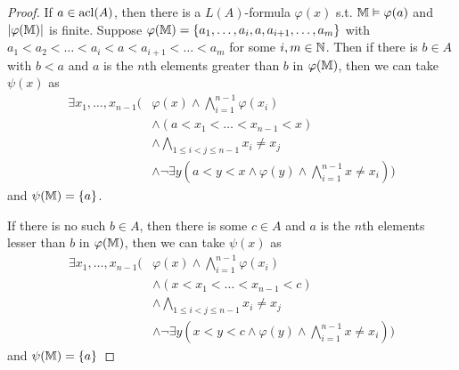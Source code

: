 \documentclass[11pt]{article}
\begin{document}
\begin{proof}
If \(a\in\operatorname{acl}(A)\), then there is a \(L(A)\)-formula \(\varphi(x)\) s.t. \(\mathbb{M}\vDash\varphi(a)\) and \(\abs{\varphi(\M)}\) is
finite. Suppose \(\varphi(\mathbb{M})=\{a_1,\dots,a_i,a,a_{i+1},\dots,a_m\}\) with \(a_1<a_2<\dots<a_i<a<a_{i+1}<\dots<a_m\) for
some \(i,m\in\mathbb{N}\). Then if there is \(b\in A\) with \(b<a\) and \(a\) is the \(n\)th elements
greater than \(b\) in \(\varphi(\mathbb{M})\), then we can take \(\psi(x)\) as
\begin{align*}
\exists x_1,\dots,x_{n-1}\Big(&\varphi(x)\wedge\bigwedge_{i=1}^{n-1}\varphi(x_i)
\\&\wedge(a<x_1<\dots<x_{n-1}<x)
\\&\wedge\bigwedge_{1\le i<j\le n-1}x_i\neq x_j
\\&\wedge\neg\exists y(a< y<x\wedge\varphi(y)\wedge\bigwedge_{i=1}^{n-1}x\neq x_i)\Big)
\end{align*}
and \(\psi(\mathbb{M})=\{a\}\).

If there is no such \(b\in A\), then there is some \(c\in A\) and \(a\) is the \(n\)th elements lesser
than \(b\) in \(\varphi(\mathbb{M})\),  then we can take \(\psi(x)\) as
\begin{align*}
\exists x_1,\dots,x_{n-1}\Big(&\varphi(x)\wedge\bigwedge_{i=1}^{n-1}\varphi(x_i)
\\&\wedge(x<x_1<\dots<x_{n-1}<c)
\\&\wedge\bigwedge_{1\le i<j\le n-1}x_i\neq x_j
\\&\wedge\neg\exists y(x< y<c\wedge\varphi(y)\wedge\bigwedge_{i=1}^{n-1}x\neq x_i)\Big)
\end{align*}
and \(\psi(\mathbb{M})=\{a\}\)
\end{proof}
\end{document}

